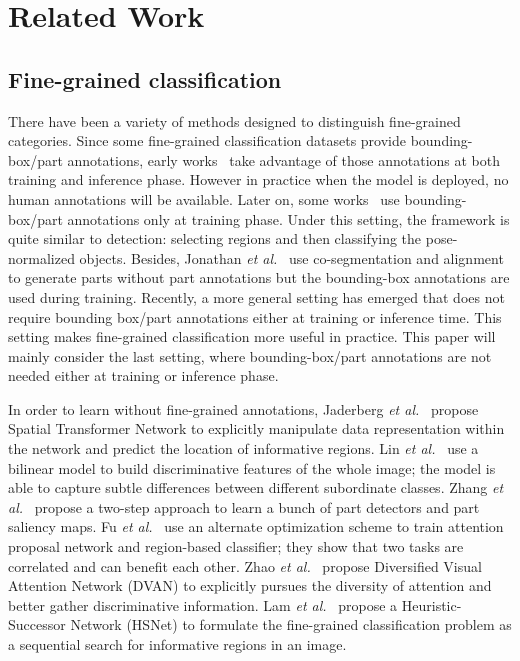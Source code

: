 \documentclass[runningheads]{llncs}
\begin{document}
 


\section{Related Work}\label{related_work}

\subsection{Fine-grained classification} 
There have been a variety of methods designed to distinguish fine-grained categories. Since some fine-grained classification datasets provide bounding-box/part annotations, early works~\cite{Xie2013Hierarchical,Chai2013Symbiotic,Berg:2013:PPO:2514950.2516271} take advantage of those annotations at both training and inference phase. However in practice when the model is deployed, no human annotations will be available. Later on, some works~\cite{BransonVBP14,ZhangECCV14} use bounding-box/part annotations only at training phase.  Under this setting, the framework is quite similar to detection: selecting regions and then classifying the pose-normalized objects. Besides, Jonathan \emph{et al.}~\cite{DengKrauseFei-Fei_CVPR2013} use co-segmentation and alignment to generate parts without part annotations but the bounding-box annotations are used during training.  Recently, a more general setting has emerged that does not require bounding box/part annotations either at training or inference time.  This setting makes fine-grained classification more useful in practice. This paper will mainly consider the last setting, where bounding-box/part annotations are not needed either at training or inference phase. 

In order to learn without fine-grained annotations, Jaderberg \emph{et al.}~\cite{NIPS2015_5854} propose Spatial Transformer Network to explicitly manipulate data representation within the network and predict the location of informative regions. Lin \emph{et al.}~\cite{lin2015bilinear} use a bilinear model to build discriminative features of the whole image; the model is able to capture subtle differences between different subordinate classes.  Zhang \emph{et al.}~\cite{Zhang_2016_CVPR} propose a two-step approach to learn a bunch of part detectors and part saliency maps. Fu \emph{et al.}~\cite{Fu_2017_CVPR} use an alternate optimization scheme to train attention proposal network and region-based classifier; they show that two tasks are correlated and can benefit each other. Zhao \emph{et al.}~\cite{Zhao:2017:DVA:3101467.3101537} propose Diversified Visual Attention Network (DVAN) to explicitly pursues the diversity of attention and better gather discriminative information. Lam \emph{et al.}~\cite{Lam_2017_CVPR} propose a Heuristic-Successor Network (HSNet) to formulate the fine-grained classification problem as a sequential search for informative regions in an image.
\end{document}
